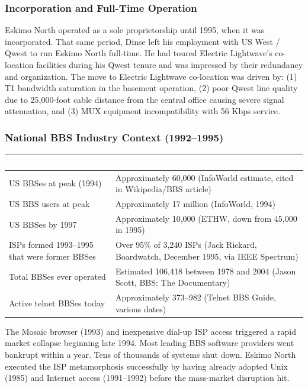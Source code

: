 \documentclass[11pt,letterpaper]{article}
\newcommand{\tableheader}[1]{\textbf{\sffamily\textcolor{white}{#1}}}
\begin{document}
\subsubsection{Incorporation and Full-Time Operation}

Eskimo North operated as a sole proprietorship until 1995, when it was incorporated. That same period, Dinse left his employment with US West / Qwest to run Eskimo North full-time. He had toured Electric Lightwave's co-location facilities during his Qwest tenure and was impressed by their redundancy and organization. The move to Electric Lightwave co-location was driven by: (1) T1 bandwidth saturation in the basement operation, (2) poor Qwest line quality due to 25,000-foot cable distance from the central office causing severe signal attenuation, and (3) MUX equipment incompatibility with 56 Kbps service.

\subsubsection{National BBS Industry Context (1992--1995)}

\begin{center}
\begin{tabularx}{\textwidth}{L{3.5cm}X}
\toprule
{}
\tableheader{Metric} & \tableheader{Value and Source} \\
\midrule
US BBSes at peak (1994) & Approximately 60,000 (InfoWorld estimate, cited in Wikipedia/BBS article) \\
US BBS users at peak & Approximately 17 million (InfoWorld, 1994) \\
US BBSes by 1997 & Approximately 10,000 (ETHW, down from 45,000 in 1995) \\
ISPs formed 1993--1995 that were former BBSes & Over 95\% of 3,240 ISPs (Jack Rickard, Boardwatch, December 1995, via IEEE Spectrum) \\
Total BBSes ever operated & Estimated 106,418 between 1978 and 2004 (Jason Scott, BBS: The Documentary) \\
Active telnet BBSes today & Approximately 373--982 (Telnet BBS Guide, various dates) \\
\bottomrule
\end{tabularx}
\end{center}

The Mosaic browser (1993) and inexpensive dial-up ISP access triggered a rapid market collapse beginning late 1994. Most leading BBS software providers went bankrupt within a year. Tens of thousands of systems shut down. Eskimo North executed the ISP metamorphosis successfully by having already adopted Unix (1985) and Internet access (1991--1992) before the mass-market disruption hit.
\end{document}
